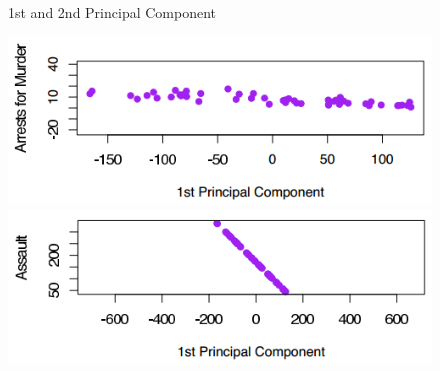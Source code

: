 {\begin{figure}[H]
\begin{minipage}[c]{0.5\textwidth}
\end{minipage}\hfill
\begin{minipage}[t]{.5\textwidth}
\end{minipage}\hfill
\begin{minipage}[t]{.5\textwidth}
\end{minipage}
\caption{1st and 2nd Principal Component}
\end{figure}

\begin{figure}[H]\centering
	\begin{minipage}[c]{0.5\textwidth}
		\includegraphics[width=1\linewidth]{images/USArrests_PCA3.png}
	\end{minipage}\hfill
	\begin{minipage}[c]{0.5\textwidth}
		\includegraphics[width=1\linewidth]{images/USArrests_PCA4.png}
	\end{minipage}\hfill
	\begin{minipage}[t]{.5\textwidth}
	\end{minipage}\hfill
	\begin{minipage}[t]{.5\textwidth}
	\end{minipage}
\end{figure}

}
